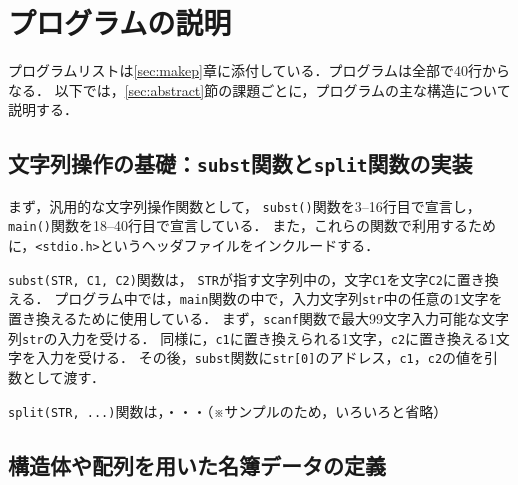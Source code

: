
\section{プログラムの説明}\label{sec:capp}

プログラムリストは\ref{sec:makep}章に添付している．プログラムは全部で40行からなる．
以下では，\ref{sec:abstract}節の課題ごとに，プログラムの主な構造について説明する．

\subsection{文字列操作の基礎：\texttt{subst}関数と\texttt{split}関数の実装}

まず，汎用的な文字列操作関数として，
\verb|subst()|関数を3--16行目で宣言し，
\verb|main()|関数を18--40行目で宣言している．
また，これらの関数で利用するために，\verb|<stdio.h>|というヘッダファイルをインクルードする．

\verb|subst(STR, C1, C2)|関数は，
\verb|STR|が指す文字列中の，文字\verb|C1|を文字\verb|C2|に置き換える．
プログラム中では，\verb|main|関数の中で，入力文字列\verb|str|中の任意の1文字を置き換えるために使用している．
まず，\verb|scanf|関数で最大99文字入力可能な文字列\verb|str|の入力を受ける．
同様に，\verb|c1|に置き換えられる1文字，\verb|c2|に置き換える1文字を入力を受ける．
その後，\verb|subst|関数に\verb|str[0]|のアドレス，\verb|c1|，\verb|c2|の値を引数として渡す．

\verb|split(STR, ...)|関数は，・・・（※サンプルのため，いろいろと省略）

\subsection{構造体や配列を用いた名簿データの定義}

